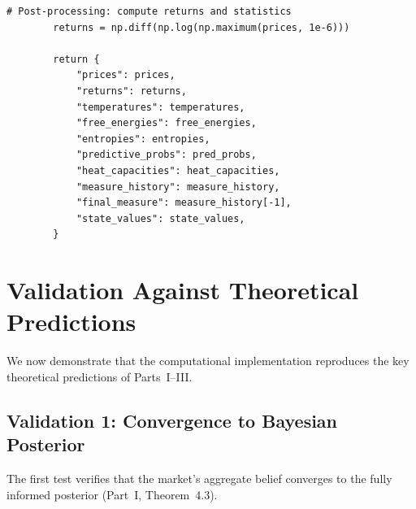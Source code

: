 \documentclass[12pt,a4paper]{article}
\theoremstyle{definition}
\begin{document}
\begin{lstlisting}[caption={Market Simulator --- Full UPMF dynamics (Part~III, Thm.~3.2)},label=lst:simulator]
        # Post-processing: compute returns and statistics
        returns = np.diff(np.log(np.maximum(prices, 1e-6)))
        
        return {
            "prices": prices,
            "returns": returns,
            "temperatures": temperatures,
            "free_energies": free_energies,
            "entropies": entropies,
            "predictive_probs": pred_probs,
            "heat_capacities": heat_capacities,
            "measure_history": measure_history,
            "final_measure": measure_history[-1],
            "state_values": state_values,
        }
\end{lstlisting}



\section{Validation Against Theoretical Predictions}\label{sec:validation}

We now demonstrate that the computational implementation reproduces the key theoretical predictions of Parts~I--III.

\subsection{Validation 1: Convergence to Bayesian Posterior}

The first test verifies that the market's aggregate belief converges to the fully informed posterior (Part~I, Theorem~4.3).
\end{document}
